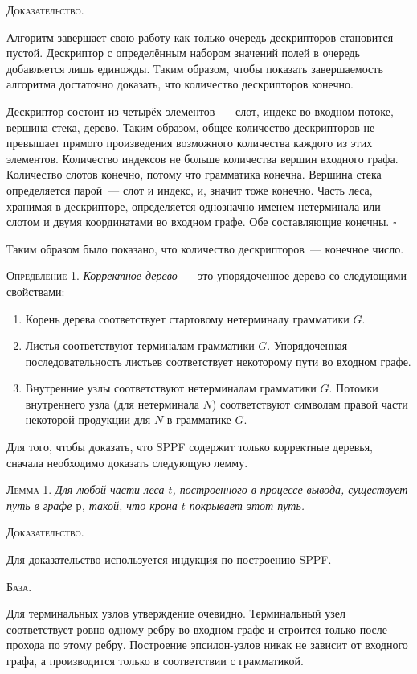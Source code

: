 \textsc{Доказательство.}

Алгоритм завершает свою работу как только очередь дескрипторов становится пустой. Дескриптор с определённым набором значений полей в очередь добавляется лишь единожды. Таким образом, чтобы показать завершаемость алгоритма достаточно доказать, что количество дескрипторов конечно. 

Дескриптор состоит из четырёх элементов~--- слот, индекс во входном потоке, вершина стека, дерево. Таким образом, общее количество дескрипторов не превышает прямого произведения возможного количества каждого из этих элементов. Количество индексов не больше количества вершин входного графа. Количество слотов конечно, потому что грамматика конечна. Вершина стека определяется парой~--- слот и индекс, и, значит тоже конечно. Часть леса, хранимая в дескрипторе, определяется однозначно именем нетерминала или слотом и двумя координатами во входном графе. Обе составляющие конечны. $\square$

Таким образом было показано, что количество дескрипторов~--- конечное число.

\textsc{Определение 1.} 
\emph{Корректное дерево}~--- это упорядоченное дерево со следующими свойствами:
\begin{enumerate}
  \item Корень дерева соответствует стартовому нетерминалу грамматики $G$.
  \item Листья соответствуют терминалам грамматики $G$. Упорядоченная последовательность листьев соответствует некоторому пути во входном графе.
  \item Внутренние узлы соответствуют нетерминалам грамматики $G$. Потомки внутреннего узла (для нетерминала $N$) соответствуют символам правой части некоторой продукции для $N$ в грамматике $G$.
\end{enumerate}

Для того, чтобы доказать, что SPPF содержит только корректные деревья, сначала необходимо доказать следующую лемму.

\textsc{Лемма 1.} 
\textit{Для любой части леса $t$, построенного в процессе вывода, существует путь в графе $р$, такой, что крона $t$ покрывает этот путь. }

\textsc{Доказательство.}

Для доказательство используется индукция по построению SPPF. 

\textsc{База.}

Для терминальных узлов утверждение очевидно. Терминальный узел соответствует ровно одному ребру во входном графе и строится только после прохода по этому ребру. Построение эпсилон-узлов никак не зависит от входного графа, а производится только в соответствии с грамматикой. 

